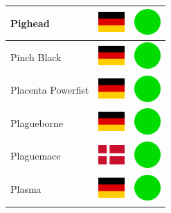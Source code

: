 \documentclass[12pt, a4paper, twoside]{report}
\begin{document}
\begin{center}
\begin{longtable}{|p{5cm}|p{2cm}|p{2cm}|}
 Pighead                                                    & \includegraphics[width=1cm]{../img/flags/de} &   \includegraphics[width=1cm]{../likes/y} \\ \hline
 Pinch Black                                                & \includegraphics[width=1cm]{../img/flags/de} &   \includegraphics[width=1cm]{../likes/y} \\ \hline
 Placenta Powerfist                                         & \includegraphics[width=1cm]{../img/flags/de} &   \includegraphics[width=1cm]{../likes/y} \\ \hline
 Plagueborne                                                & \includegraphics[width=1cm]{../img/flags/de} &   \includegraphics[width=1cm]{../likes/y} \\ \hline
 Plaguemace                                                 & \includegraphics[width=1cm]{../img/flags/dk} &   \includegraphics[width=1cm]{../likes/y} \\ \hline
 Plasma                                                     & \includegraphics[width=1cm]{../img/flags/de} &   \includegraphics[width=1cm]{../likes/y} \\ \hline

\end{longtable}
\end{center}
\end{document}
